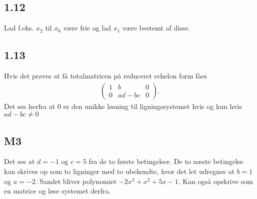		\subsection{1.12} 

			Lad f.eks. $x_2$ til $x_6$ være frie og lad $x_1$ være bestemt af disse.

		\subsection{1.13}

			Hvis det prøves at få totalmatricen på reduceret echelon form fåes
				\begin{align*}
					\left(\begin{array}{cc|c} {1} & {b} & {0} \\ {0} & {ad-bc} & {0} \end{array}\right).
				\end{align*} 
			Det ses herfra at $0$ er den unikke løsning til ligningssystemet hvis og kun hvis $ad-bc\neq 0$

		\subsection{M3}

			Det ses at $d=-1$ og $c=5$ fra de to første betingelser. De to næste betingelse kan skrives op som to ligninger med to ubekendte, hvor det let udregnes at $b=1$ og $a=-2$. Samlet bliver polynomiet $-2x^3+x^2+5x-1$. Kan også opskrive som en matrice og løse systemet derfra.

















